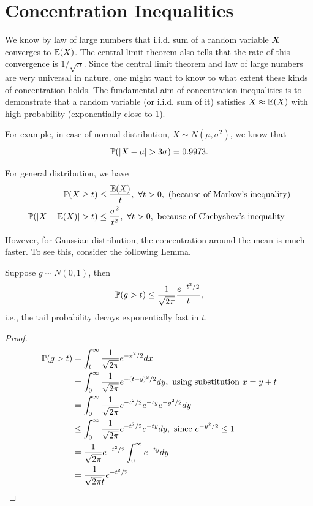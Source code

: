\documentclass[12pt]{article}
\begin{document}
\pagebreak
\section{Concentration Inequalities}

We know by law of large numbers that i.i.d. sum of a random variable $\boldsymbol{X}$ converges to $\mathbb{E}(X)$. The central limit theorem also tells that the rate of this convergence is $1/\sqrt{n}$. Since the central limit theorem and law of large numbers are very universal in nature, one might want to know to what extent these kinds of concentration holds. The fundamental aim of concentration inequalities is to demonstrate that a random variable (or i.i.d. sum of it) satisfies $X \approx \mathbb{E}(X)$ with high probability (exponentially close to $1$).

For example, in case of normal distribution, $X \sim N(\mu, \sigma^2)$, we know that
\begin{equation*}
    \mathbb{P}(\vert X - \mu\vert > 3\sigma) = 0.9973.
\end{equation*}

For general distribution, we have
\begin{align*}
    \prob(X \geq t)                 & \leq \dfrac{\E(X)}{t}, \ \forall t > 0, \ \text{(because of Markov's inequality)}       \\
    \prob(\vert X - \E(X)\vert > t) & \leq \dfrac{\sigma^2}{t^2}, \ \forall t > 0, \ \text{because of Chebyshev's inequality}
\end{align*}

However, for Gaussian distribution, the concentration around the mean is much faster. To see this, consider the following Lemma.

\begin{theorembox}
    Suppose $g \sim N(0, 1)$, then
    \begin{equation*}
        \mathbb{P}(g > t) \leq \frac{1}{\sqrt{2\pi}} \frac{e^{-t^2/2}}{t},
    \end{equation*}
    \noindent i.e., the tail probability decays exponentially fast in $t$.
\end{theorembox}
\begin{proof}
    \begin{align*}
        \mathbb{P}(g > t) & = \int_{t}^{\infty} \frac{1}{\sqrt{2\pi}} e^{-x^2/2}dx                                               \\
                     & = \int_{0}^{\infty} \frac{1}{\sqrt{2\pi}} e^{-(t+y)^2/2} dy, \text{ using substitution } x = y + t   \\
                     & = \int_{0}^{\infty} \frac{1}{\sqrt{2\pi}} e^{-t^2/2} e^{-ty} e^{-y^2/2} dy                           \\
                     & \leq \int_{0}^{\infty} \frac{1}{\sqrt{2\pi}} e^{-t^2/2} e^{-ty} dy, \text{ since } e^{-y^2/2} \leq 1 \\
                     & = \frac{1}{\sqrt{2\pi}} e^{-t^2/2} \int_{0}^{\infty} e^{-ty} dy                                      \\
                     & = \dfrac{1}{\sqrt{2\pi} t} e^{-t^2/2}
    \end{align*}
\end{proof}
\end{document}
